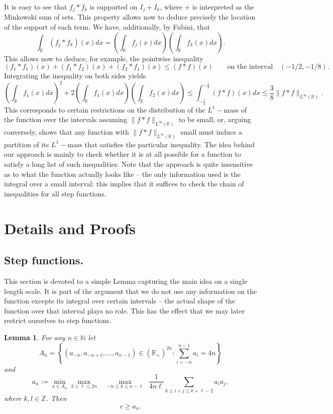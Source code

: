 \documentclass[10pt]{amsart}
\newtheorem{lemma}{Lemma}
\begin{document}
It is easy to see that $f_j * f_k$ is supported on $I_{j} + I_{k}$, where $+$ is interpreted as the
Minkowski sum of sets. This property allows now to deduce precisely the location of the support of each
term. We have, additionally, by Fubini, that
$$ \int_{\mathbb{R}}{(f_j * f_k)(x)dx} = \left(\int_{\mathbb{R}}{f_j(x)dx}\right)\left(\int_{\mathbb{R}}{f_k(x)dx}\right).$$
This allows now to deduce, for example, the pointwise inequality 
$$  (f_1*f_1)(x) + (f_1*f_2)(x) + (f_2*f_1)(x) \leq (f*f)(x) \qquad \mbox{on the interval} \quad (-1/2,-1/8).$$
Integrating the inequality on both sides yields
$$ \left(\int_{\mathbb{R}}{f_1(x)dx}\right)^2 + 2\left(\int_{\mathbb{R}}{f_1(x)dx}\right)\left(\int_{\mathbb{R}}{f_2(x)dx}\right) 
\leq \int_{-\frac{1}{2}}^{-\frac{1}{8}}{(f*f)(x)dx} \leq \frac{3}{8}\|f*f\|_{L^{\infty}(\mathbb{R})}.$$
This corresponds to certain restrictions on the distribution of the $L^1-$mass of the function
over the intervals assuming $\|f*f\|_{L^{\infty}(\mathbb{R})}$ to be small, or, arguing conversely,
shows that any function with $\|f*f\|_{L^{\infty}(\mathbb{R})}$ small must induce a partition of
its $L^1-$mass that satisfies the particular inequality. The idea behind our approach is mainly to check
whether it is at all possible for a function to satisfy a long list of such inequalities.
Note that the approach
is quite insensitive as to what the function actually looks like -- the only information used is the integral
over a small interval: this implies that it suffices to check the chain of inequalities for all step functions.




\section{Details and Proofs}
\subsection{Step functions.} This section is devoted to a simple Lemma capturing the main idea on a single length scale. It is 
part of the argument that we do not use any information on the function excepts its integral over
certain intervals -- the actual shape of the function over that interval plays no role. This has the effect
 that we may later restrict ourselves to step functions. 
\begin{lemma} For any $n \in \mathbb{N}$ let
$$ A_n = \left\{(a_{-n}, a_{-n+1}, \dots, a_{n-1}) \in (\mathbb{R}_{+})^{2n}: \sum_{i=-n}^{n-1}{a_i} = 4n\right\}$$
and
$$a_n := \min_{a \in A_n} \max_{2 \leq \ell \leq 2n} ~~~~\max_{-n \leq k \leq n-\ell}~~
\frac{1}{4n\ell}\sum_{k \leq i+j \leq k +\ell - 2}{a_i a_j},$$
where $k, l \in \mathbb{Z}$. Then
$$ c \geq a_n.$$
\end{lemma}
\end{document}
